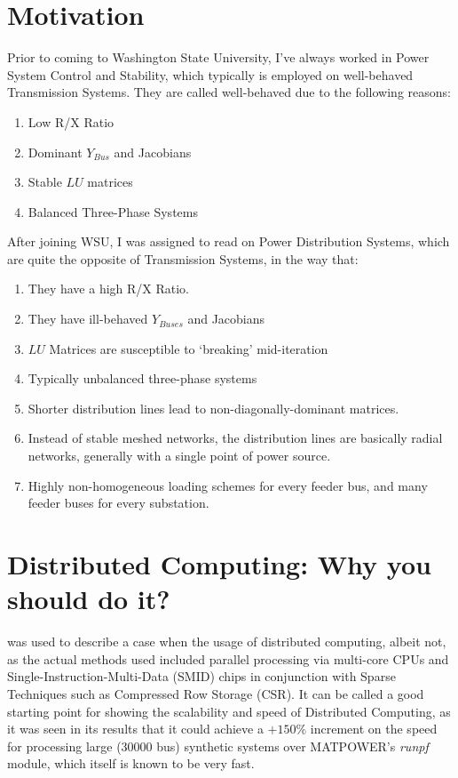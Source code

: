 \documentclass[journal]{IEEEtran}
\begin{document}
\section{Motivation}
Prior to coming to Washington State University, I've always worked in Power System Control and Stability, which typically is employed on well-behaved Transmission Systems. They are called well-behaved due to the following reasons:
\begin{enumerate}
	\item Low R/X Ratio
	\item Dominant $Y_{Bus}$ and Jacobians
	\item Stable $LU$ matrices
	\item Balanced Three-Phase Systems
\end{enumerate}

After joining WSU, I was assigned to read on Power Distribution Systems, which are quite the opposite of Transmission Systems, in the way that:
\begin{enumerate}
	\item They have a high R/X Ratio.
	\item They have ill-behaved $Y_{Buses}$ and Jacobians
	\item $LU$ Matrices are susceptible to `breaking' mid-iteration
	\item Typically unbalanced three-phase systems
	\item Shorter distribution lines lead to non-diagonally-dominant matrices.
	\item Instead of stable meshed networks, the distribution lines are basically radial networks, generally with a single point of power source.
	\item Highly non-homogeneous loading schemes for every feeder bus, and many feeder buses for every substation.
\end{enumerate}
\label{motivation}
 
\section{Distributed Computing: Why you should do it?}

\cite{fastNRPFBasedOnSparseTechniquesAndParallelProcessing} was used to describe a case when the usage of distributed computing, albeit not, as the actual methods used included parallel processing via multi-core CPUs and Single-Instruction-Multi-Data (SMID) chips in conjunction with Sparse Techniques such as Compressed Row Storage (CSR). It can be called a good starting point for showing the scalability and speed of Distributed Computing, as it was seen in its results that it could achieve a $+150\%$ increment on the speed for processing large ($30000$ bus) synthetic systems over MATPOWER's \textit{runpf} module, which itself is known to be very fast.
\end{document}
